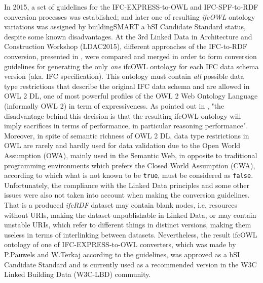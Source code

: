 In 2015, a set of guidelines for the IFC-EXPRESS-to-OWL and IFC-SPF-to-RDF conversion processes was established; and later one of resulting \emph{ifcOWL} ontology variations was assigned by buildingSMART a bSI Candidate Standard status, despite some known disadvantages.
At the 3rd Linked Data in Architecture and Construction Workshop (LDAC2015), different approaches of the IFC-to-RDF conversion, presented in \cite{pauwels2016express, vu2015implementation, vu2014opening}, were compared and merged in order to form conversion guidelines for generating the only \emph{one} ifcOWL ontology for each IFC data schema version (aka. IFC specification).
This ontology must contain \emph{all} possible data type restrictions that describe the original IFC data schema and are allowed in OWL 2 DL, one of most powerful profiles of the OWL 2 Web Ontology Language (informally OWL 2) in term of expressiveness.
As pointed out in \cite{pauwels2016express}, "the disadvantage behind this decision is that the resulting ifcOWL ontology will imply sacrifices in terms of performance, in particular reasoning performance".
Moreover, in spite of semantic richness of OWL 2 DL, data type restrictions in OWL are rarely and hardly used for data validation due to the Open World Assumption (OWA), mainly used in the Semantic Web, in opposite to traditional programming environments which prefers the Closed World Assumption (CWA), according to which what is not known to be \texttt{true}, must be considered as \texttt{false}.
Unfortunately, the compliance with the Linked Data principles and some other issues were also not taken into account when making the conversion guidelines.
That is a produced \emph{ifcRDF} dataset may contain blank nodes, i.e. resources without URIs, making the dataset unpublishable in Linked Data, or may contain unstable URIs, which refer to different things in distinct versions, making them useless in terms of interlinking between datasets.
Nevertheless, the result ifcOWL ontology of one of IFC-EXPRESS-to-OWL converters, which was made by P.Pauwels and W.Terkaj \cite{pauwels2016express} according to the guidelines, was approved as a bSI Candidate Standard and is currently used as a recommended version in the W3C Linked Building Data (W3C-LBD) community.





